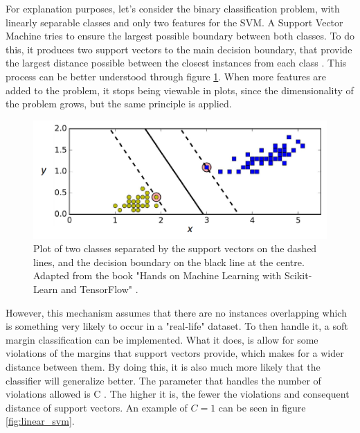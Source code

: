 For explanation purposes, let's consider the binary classification problem, with linearly separable classes and only two features for the \gls{SVM}. A Support Vector Machine tries to ensure the largest possible boundary between both classes. To do this, it produces two support vectors to the main decision boundary, that provide the largest distance possible between the closest instances from each class \cite{hearst1998support}. This process can be better understood through figure \ref{fig:svm_func}. When more features are added to the problem, it stops being viewable in plots, since the dimensionality of the problem grows, but the same principle is applied.

\begin{figure}[h]
	\centering
	\includegraphics[width=\textwidth]{../images/results/svm_func.png}
	\caption{Plot of two classes separated by the support vectors on the dashed lines, and the decision boundary on the black line at the centre. Adapted from the book "Hands on Machine Learning with Scikit-Learn and TensorFlow" \cite{geron2017hands}.} 
	\label{fig:svm_func}
\end{figure}

However, this mechanism assumes that there are no instances overlapping which is something very likely to occur in a "real-life" dataset. To then handle it, a soft margin classification can be implemented. What it does, is allow for some violations of the margins that support vectors provide, which makes for a wider distance between them. By doing this, it is also much more likely that the classifier will generalize better. The parameter that handles the number of violations allowed is C \cite{geron2017hands}. The higher it is, the fewer the violations and consequent distance of support vectors. An example of $ C = 1 $ can be seen in figure \ref{fig:linear_svm}.


